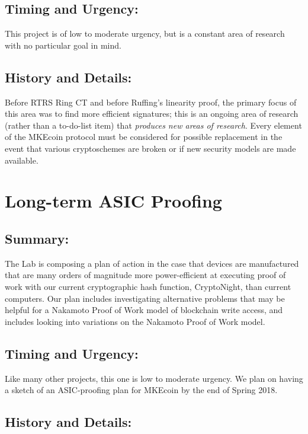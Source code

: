 \documentclass[12pt,english]{mrl}
\theoremstyle{definition}
\numberwithin{equation}{section}
\numberwithin{figure}{section}
\numberwithin{equation}{section}
\numberwithin{equation}{section}
\numberwithin{figure}{section}
\begin{document}
\subsection{Timing and Urgency:} 

This project is of low to moderate urgency, but is a constant area of research with no particular goal in mind. 

\subsection{History and Details:} 

Before RTRS Ring CT and before Ruffing's linearity proof, the primary focus of this area was to find more efficient signatures; this is an ongoing area of research (rather than a to-do-list item) that \textit{produces new areas of research}. Every element of the MKEcoin protocol must be considered for possible replacement in the event that various cryptoschemes are broken or if new security models are made available. 
 
 
\section{Long-term ASIC Proofing}

\subsection{Summary:}

The Lab is composing a plan of action in the case that devices are manufactured that are many orders of magnitude more power-efficient at executing proof of work with our current cryptographic hash function, CryptoNight, than current computers. Our plan includes investigating alternative problems that may be helpful for a Nakamoto Proof of Work model of blockchain write access, and includes looking into variations on the Nakamoto Proof of Work model.

\subsection{Timing and Urgency:}

Like many other projects, this one is low to moderate urgency. We plan on having a sketch of an ASIC-proofing plan for MKEcoin by the end of Spring 2018.

\subsection{History and Details:}
\end{document}

